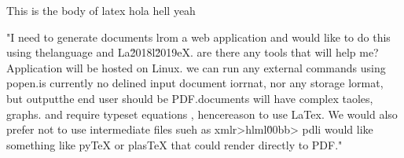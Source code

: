 \documentclass[12pt]{article}
\title\{\{\{title\}\}\}
\author{Rose Xu}
\date{\today}
\begin{document}
\maketitle

This is the body of latex hola hell yeah

"I need to generate documents lrom a web application and would like to do this using the\nPython language and La\u2018l\u2019eX. are there any tools that will help me?\n\nEdit\nThis Application will be hosted on Linux. we can run any external commands using popen.\nthere is currently no delined input document iorrnat, nor any storage lormat, but output\nto the end user should be PDF.\n{}\nThese documents will have complex taoles, graphs. and require typeset equations , hence\nthe reason to use LaTex. We would also prefer not to use intermediate files sueh as xmlr\n\n>hlml\u00bb> pdl\n\nideally i would like something like pyTeX or plasTeX that could render directly to PDF."
\end{document}
